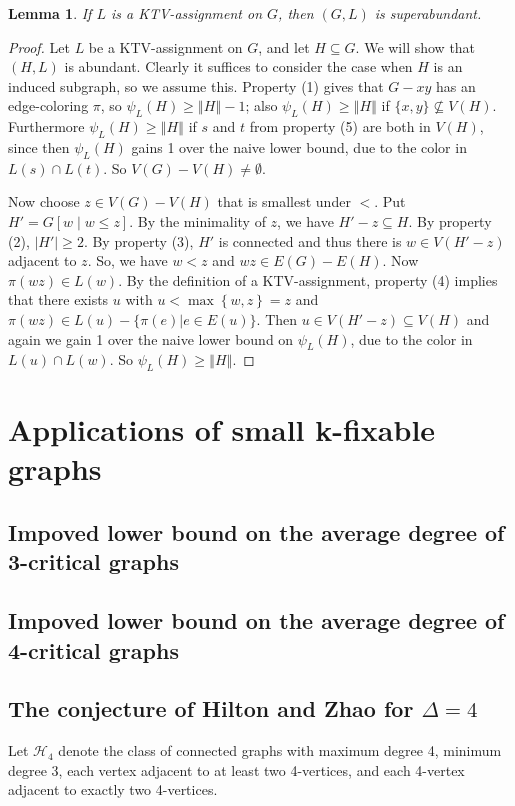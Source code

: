 \documentclass[12pt]{article}
\theoremstyle{plain}
\newtheorem{lem}[thm]{Lemma}
\theoremstyle{definition}
\theoremstyle{remark}
\newcommand{\fancy}[1]{\mathcal{#1}}
\newcommand{\set}[1]{\left\{ #1 \right\}}
\newcommand{\card}[1]{\left|#1\right|}
\newcommand{\size}[1]{\left\Vert#1\right\Vert}
\newcommand{\brackets}[1]{\left[ #1 \right]}
\def\H{\fancy{H}}
\begin{document}
\begin{lem}\label{KTVImpliesSuperabundant}
If $L$ is a KTV-assignment on $G$, then $(G, L)$ is superabundant.
\end{lem}
\begin{proof}
Let $L$ be a KTV-assignment on $G$, and let $H \subseteq G$.  We will show that
$(H,L)$ is abundant.  
Clearly it suffices to consider the case when $H$ is an induced subgraph, so we
assume this.
Property (1) gives that $G-xy$ has an edge-coloring
$\pi$, so $\psi_L(H)\ge \size{H}-1$; also $\psi_L(H)\ge \size{H}$ if
$\{x,y\}\not\subseteq V(H)$.  Furthermore $\psi_L(H)\ge \size{H}$ if $s$ and
$t$ from property (5) are both in $V(H)$, since then $\psi_L(H)$ gains 1 over
the naive lower bound, due to the color in $L(s)\cap L(t)$.  So $V(G)-
V(H)\ne \emptyset$.

Now choose $z \in V(G) - V(H)$ that is smallest under $<$.  
Put $H' = G\brackets{w \mid w \le z}$.  By the minimality of $z$, we have $H' - z \subseteq H$. By property (2), $\card{H'} \ge 2$.  
By property (3), $H'$ is connected and thus there is $w \in V(H' - z)$ adjacent to $z$. So, we have $w < z$ and $wz\in E(G)-E(H)$.
Now $\pi(wz)\in L(w)$.  By the definition of a KTV-assignment, 
property (4) implies that there exists $u$ with $u < \max\set{w, z} = z$ and $\pi(wz) \in
L(u)-\{\pi(e)|e\in E(u)\}$.  Then $u \in V(H' - z) \subseteq V(H)$ and
again we gain 1 over the naive lower bound on $\psi_L(H)$, due to the color
in $L(u)\cap L(w)$.  So $\psi_L(H)\ge \size{H}$.
\end{proof}

\section{Applications of small k-fixable graphs}
\subsection{Impoved lower bound on the average degree of 3-critical graphs}
\subsection{Impoved lower bound on the average degree of 4-critical graphs}
\subsection{The conjecture of Hilton and Zhao for $\Delta=4$}
Let $\H_4$ denote the class of connected graphs with maximum degree 4, minimum
degree 3, each vertex adjacent to at least two 4-vertices, and each 4-vertex
adjacent to exactly two 4-vertices.

\end{document}

